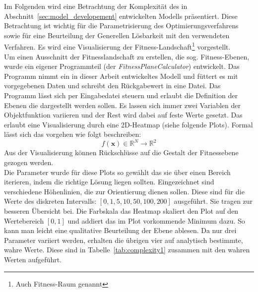 %
Im Folgenden wird eine Betrachtung der Komplexität des in Abschnitt~\ref{sec:model_developement} entwickelten Modells präsentiert. Diese Betrachtung ist wichtig für die Parametrisierung des Optimierungsverfahrens sowie für eine Beurteilung der Generellen Lösbarkeit mit den verwendeten Verfahren. Es wird eine Visualisierung der Fitness-Landschaft\footnote{Auch Fitness-Raum genannt} vorgestellt.\\
%

Um einen Ausschnitt der Fitnesslandschaft zu erstellen, die sog. Fitness-Ebenen, wurde ein eigener Programmteil (der \textit{FitnessPlaneCalculator}) entwickelt. Das Programm nimmt ein in dieser Arbeit entwickeltes Modell und füttert es mit vorgegebenen Daten und schreibt den Rückgabewert in eine Datei. Das Programm lässt sich per Eingabedatei steuern und erlaubt die Definition der Ebenen die dargestellt werden sollen. Es lassen sich immer zwei Variablen der Objektfunktion variieren und der Rest wird dabei auf feste Werte gesetzt. Das erlaubt eine Visualisierung durch eine 2D-Heatmap (siehe folgende Plots). Formal lässt sich das vorgehen wie folgt beschreiben:
%
\begin{equation}
f(\mathbf{x}) \in \mathbb{R}^{N} \rightarrow \mathbb{R}^{2}\nonumber
\end{equation}
%
Aus der Visualisierung können Rückschlüsse auf die Gestalt der Fitnessebene gezogen werden.\\
%

Die Parameter wurde für diese Plots so gewählt das sie über einen Bereich iterieren, indem die richtige Lösung liegen sollten. Eingezeichnet sind verschiedene Höhenlinien, die zur Orientierung dienen sollen. Diese sind für die Werte des diskreten Intervalls: $[0,1,5,10,50,100,200]$ ausgeführt. Sie tragen zur besseren Übersicht bei. Die Farbskala das Heatmap skaliert den Plot auf den Wertebereich $[0,1]$ und addiert das im Plot vorkommende Minimum dazu. So kann man leicht eine qualitative Beurteilung der Ebene ablesen. Da nur drei Parameter variiert werden, erhalten die übrigen vier auf analytisch bestimmte, wahre Werte. Diese sind in Tabelle~\ref{tab:complexity1} zusammen mit den wahren Werten aufgeführt.\\

